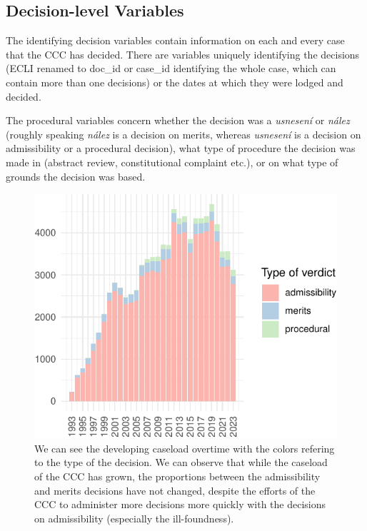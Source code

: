\documentclass[
  11pt,
]{article}
\begin{document}
\hypertarget{decision-level-variables}{%
\subsection{Decision-level Variables}\label{decision-level-variables}}

The identifying decision variables contain information on each and every
case that the CCC has decided. There are variables uniquely identifying
the decisions (ECLI renamed to doc\_id or case\_id identifying the whole
case, which can contain more than one decisions) or the dates at which
they were lodged and decided.

The procedural variables concern whether the decision was a
\emph{usnesení} or \emph{nález} (roughly speaking \emph{nález} is a
decision on merits, whereas \emph{usnesení} is a decision on
admissibility or a procedural decision), what type of procedure the
decision was made in (abstract review, constitutional complaint etc.),
or on what type of grounds the decision was based.

\begin{figure}
\centering
\includegraphics{ANONYMIZED_The_Czech_Constitutional_Court_Dataset_files/figure-latex/caseload-1.pdf}
\caption{We can see the developing caseload overtime with the colors
refering to the type of the decision. We can observe that while the
caseload of the CCC has grown, the proportions between the admissibility
and merits decisions have not changed, despite the efforts of the CCC to
administer more decisions more quickly with the decisions on
admissibility (especially the ill-foundness).}
\end{figure}
\end{document}
